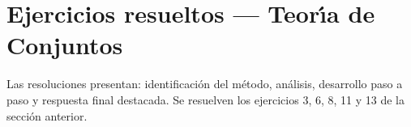 

\newpage
\section{Ejercicios resueltos --- Teor\'{\i}a de Conjuntos}

\begin{tcolorbox}[
  enhanced, colback=GrisClaro, colframe=AzulPizarra,
  arc=2pt, boxrule=0.7pt, left=8pt, right=8pt, top=4pt, bottom=4pt
]
\small\sffamily
Las resoluciones presentan: identificaci\'on del m\'etodo, an\'alisis,
desarrollo paso a paso y respuesta final destacada. Se resuelven los
ejercicios 3, 6, 8, 11 y 13 de la secci\'on anterior.
\end{tcolorbox}

\vspace{0.4cm}

